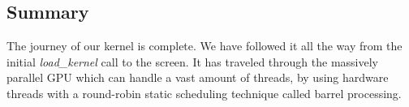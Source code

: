 \documentclass[../main/report.tex]{subfiles}
\begin{document}












\subsection{Summary}
The journey of our kernel is complete.
We have followed it all the way from the initial \emph{load\_kernel} call to the screen.
It has traveled through the massively parallel GPU which can handle a vast amount of threads,
by using hardware threads with a round-robin static scheduling technique called barrel processing.
\end{document}
